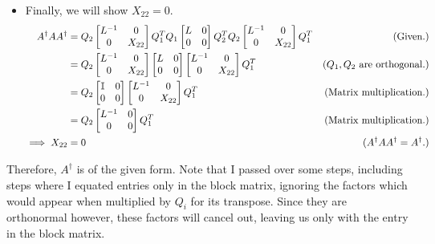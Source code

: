\begin{solution}
\begin{itemize}
        \item Finally, we will show $X_{22} = 0$.
        \alignbreak
        \begin{align}
            A^\dag AA^\dag &= Q_2\begin{bmatrix}L^{-1} &0 \\ 0 &X_{22}\end{bmatrix}Q_1^TQ_1 \begin{bmatrix}L &0\\ 0 &0\end{bmatrix}Q_2^TQ_2 \begin{bmatrix}L^{-1} &0 \\0 &X_{22}\end{bmatrix}Q_1^T &\text{(Given.)}\nonumber\\
            &= Q_2\begin{bmatrix}L^{-1} &0 \\ 0 &X_{22}\end{bmatrix} \begin{bmatrix}L &0\\ 0&0\end{bmatrix} \begin{bmatrix}L^{-1} &0 \\0 &X_{22}\end{bmatrix}Q_1^T &\text{($Q_1, Q_2$ are orthogonal.)}\nonumber\\
            &= Q_2\begin{bmatrix}\mathbb{I} &0\\0&0\end{bmatrix}\begin{bmatrix}L^{-1} &0 \\ 0&X_{22}\end{bmatrix}Q_1^T &\text{(Matrix multiplication.)}\nonumber\\
            &= Q_2\begin{bmatrix}L^{-1} &0 \\0&0\end{bmatrix}Q_1^T &\text{(Matrix multiplication.)}\nonumber\\
            \implies X_{22} &= 0 &(A^\dag AA^\dag = A^\dag.) \nonumber
        \end{align}
        \alignbreak
    \end{itemize}

    Therefore, $A^\dag$ is of the given form. Note that I passed over some steps, including steps where I equated entries only in the block matrix, ignoring the factors which would appear when multiplied by $Q_i$ for its transpose. Since they are orthonormal however, these factors will cancel out, leaving us only with the entry in the block matrix. 
\end{solution}

